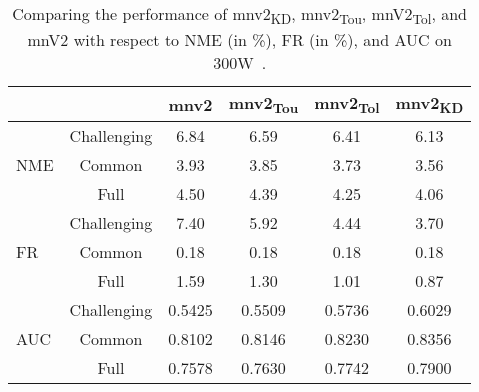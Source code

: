 \documentclass[times,twocolumn,final,authoryear]{elsarticle}
\begin{document}
\begin{table}[t]
\caption{Comparing the performance of mnv2\textsubscript{KD}, mnv2\textsubscript{Tou}, mnV2\textsubscript{Tol}, and mnV2 with respect to NME (in \%), FR (in \%), and AUC on 300W~\cite{sagonas2013300}.}
\label{tbl:study-kd-effect}
\centering
\small
\begin{tabular}{lccccc}
\hline 
\multicolumn{2}{l}{}             & mnv2   & mnv2\textsubscript{Tou} & mnv2\textsubscript{Tol} & \textbf{mnv2\textsubscript{KD}}  \\ \hline \hline

\multirow{3}{*}{NME} & Challenging & 6.84   & 6.59           & 6.41         & 6.13   \\ 
                     & Common      & 3.93   & 3.85           & 3.73         & 3.56   \\ 
                     & Full        & 4.50   & 4.39           & 4.25         & 4.06   \\  \hline
\multirow{3}{*}{FR}  & Challenging & 7.40   & 5.92           & 4.44         & 3.70   \\ 
                     & Common      & 0.18   & 0.18           & 0.18         & 0.18   \\ 
                     & Full        & 1.59   & 1.30           & 1.01         & 0.87   \\  \hline
\multirow{3}{*}{AUC} & Challenging & 0.5425 & 0.5509         & 0.5736       & 0.6029 \\ 
                     & Common      & 0.8102 & 0.8146         & 0.8230       & 0.8356 \\ 
                     & Full        & 0.7578 & 0.7630         & 0.7742       & 0.7900 \\ 
                     
\hline
\end{tabular}
\end{table}
 \begin{table}[t!] 
\caption{NME (in \%) of different loss functions using MobileNetV2~\cite{sandler2018MobileNetV2} for 68-point landmarks detection on 300W~\cite{sagonas2013300}.}

\label{tbl:tbl_different_loss_affect}
\centering
\small
{}
\end{table}
\end{document}
